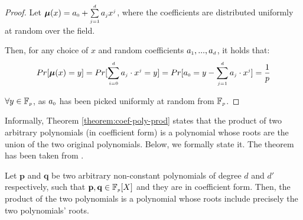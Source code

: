 \begin{proof} Let $\bm\mu(x)=a_{\scriptscriptstyle 0}+\sum\limits^{\scriptscriptstyle d}_{\scriptscriptstyle j=1} a_{\scriptscriptstyle j}x^{\scriptscriptstyle j}$, where the  coefficients  are distributed uniformly at random over the field. 



Then, for any choice of $x$ and random coefficients   $a_{\scriptscriptstyle 1},...,a_{\scriptscriptstyle d}$, it holds that:
%
$$Pr[\bm\mu(x)=y]=Pr[\sum\limits_{\scriptscriptstyle i=0}^{\scriptscriptstyle d} a_{\scriptscriptstyle j}\cdot x^{\scriptscriptstyle j} = y] = Pr[a_{\scriptscriptstyle 0} = y-\sum\limits_{\scriptscriptstyle j=1}^{\scriptscriptstyle d} a_{\scriptscriptstyle j}\cdot x^{\scriptscriptstyle j}] = \frac{1}{p}$$

  $\forall y\in \mathbb{F}_{\scriptscriptstyle p}$, as $a_{\scriptscriptstyle 0}$ has been picked uniformly at random from $\mathbb{F}_{\scriptscriptstyle p}$. 
%
\end{proof} 



Informally, Theorem \ref{theorem:coef-poly-prod} states that the product of two arbitrary polynomials (in coefficient form) is a polynomial whose roots are the union of the two original polynomials.  Below, we formally state it. The theorem has been taken from \cite{AbadiMZ21}. 


\begin{theorem}\label{theorem:coef-poly-prod}
Let $\mathbf{p}$ and   $\mathbf{q}$ be two arbitrary non-constant polynomials of degree $d$ and $d'$ respectively, such that  $\mathbf{p} , \mathbf{q}   \in \mathbb{F}_{\scriptscriptstyle p}[X]$ and they are in coefficient form. Then, the product of the two polynomials is a polynomial whose roots include precisely the two polynomials' roots. 
\end{theorem}




